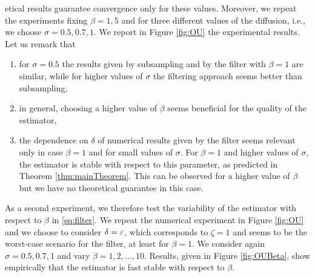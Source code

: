 \documentclass[10pt]{article}
\begin{document}
etical results guarantee convergence only for these values. Moreover, we repeat the experiments fixing $\beta = 1, 5$ and for three different values of the diffusion, i.e., we choose $\sigma = 0.5, 0.7, 1$. We report in Figure \ref{fig:OU} the experimental results. Let us remark that
\begin{enumerate}
	\item for $\sigma = 0.5$ the results given by subsampling and by the filter with $\beta = 1$ are similar, while for higher values of $\sigma$ the filtering approach seems better than subsampling, 
	\item in general, choosing a higher value of $\beta$ seems beneficial for the quality of the estimator,
	\item the dependence on $\delta$ of numerical results given by the filter seems relevant only in case $\beta = 1$ and for small values of $\sigma$. For $\beta = 1$ and higher values of $\sigma$, the estimator is stable with respect to this parameter, as predicted in Theorem \ref{thm:mainTheorem}. This can be observed for a higher value of $\beta$ but we have no theoretical guarantee in this case.
\end{enumerate}

As a second experiment, we therefore test the variability of the estimator with respect to $\beta$ in \eqref{eq:filter}. We repeat the numerical experiment in Figure \ref{fig:OU} and we choose to consider $\delta = \varepsilon$, which corresponds to $\zeta = 1$ and seems to be the worst-case scenario for the filter, at least for $\beta = 1$. We consider again $\sigma = 0.5, 0.7, 1$ and vary $\beta = 1, 2, \ldots, 10$. Results, given in Figure \ref{fig:OUBeta}, show empirically that the estimator is fast stable with respect to $\beta$.
\end{document}
